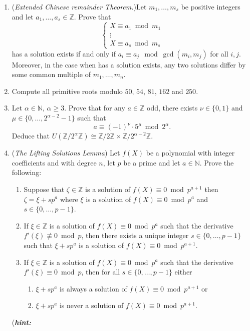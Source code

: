\documentclass[a4paper,12pt]{article}
\begin{document}
\begin{enumerate}
\item (\textit{Extended Chinese remainder Theorem.})Let $m_1,\ldots,m_s$ be positive integers and let $a_1,\ldots,a_s\in\mathbb Z$. Prove that
$$\begin{cases}X\equiv a_1\bmod m_1\\ \vdots\\ X\equiv a_s\bmod m_s 
 \end{cases}$$
has a solution exists if and only if $a_i\equiv a_j\mod \gcd(m_i,m_j)$ for all $i,j$. Moreover, 
in the case when has a solution exists, any two solutions differ by some common multiple of $m_1,\ldots,m_n$. 
 \item  Compute all primitive roots modulo $50$, $54$, $81$, $162$ and $250$.
 \item  Let $\alpha\in\mathbb N$, $\alpha\ge3$. 
 Prove that for any $a\in\mathbb Z$ odd, there exists $\nu\in\{0,1\}$ and $\mu\in\{0,\ldots,2^{\alpha-2}-1\}$ such that
 $$a\equiv (-1)^\nu\cdot 5^\mu\bmod 2^\alpha.$$
 Deduce that \qquad $\displaystyle U(\mathbb Z/2^\alpha\mathbb Z)\cong \mathbb Z/2\mathbb Z\times \mathbb Z/2^{\alpha-2}\mathbb Z.$ 
 \item (\textit{The Lifting Solutions Lemma}) Let $f(X)$ be a polynomial with integer coefficients and with degree $n$, let $p$ be a prime and let $a\in\mathbb N$. 
 Prove the following:
 \begin{enumerate}
  \item Suppose that $\zeta\in\mathbb Z$ is a solution of $f(X)\equiv0\bmod p^{a+1}$ 
  then $\zeta=\xi+sp^{a}$ where $\xi$ is a solution of $f(X)\equiv0\bmod p^{a}$ and $s\in\{0,\ldots,p-1\}$.
  \item If $\xi\in\mathbb Z$ is a solution of $f(X)\equiv0\bmod p^{a}$ such that the derivative $f'(\xi)\not\equiv0\bmod p$, 
  then there exists a unique integer $s\in\{0,\ldots,p-1\}$ such that $\xi+sp^{a}$ is a solution of $f(X)\equiv0\bmod p^{a+1}$.
  \item If $\xi\in\mathbb Z$ is a solution of $f(X)\equiv0\bmod p^{a}$ such that the derivative $f'(\xi)\equiv0\bmod p$, 
  then for all $s\in\{0,\ldots,p-1\}$ either \begin{enumerate}
        \item $\xi+sp^{a}$ is always a solution of $f(X)\equiv0\bmod p^{a+1}$ or
        \item $\xi+sp^{a}$ is never a solution of $f(X)\equiv0\bmod p^{a+1}$.
       \end{enumerate}
 \end{enumerate}
{  \small{(\textit{\textbf{hint:} 
}}}
\end{enumerate}
\end{document}
